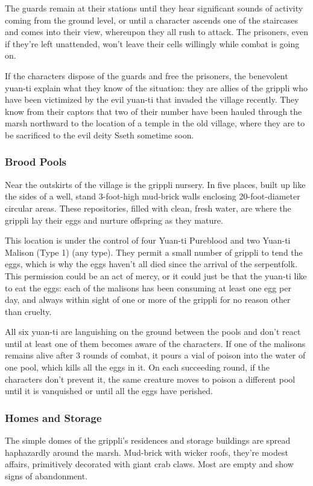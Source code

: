 \documentclass[10pt,a4paper,twoside,bg=print,twocolumn,openany,nodeprecatedcode]{dndbook}
\begin{document}
The guards remain at their stations until they hear significant sounds of activity coming from the ground level, or until a character ascends one of the staircases and comes into their view, whereupon they all rush to attack. The prisoners, even if they're left unattended, won't leave their cells willingly while combat is going on.

If the characters dispose of the guards and free the prisoners, the benevolent yuan-ti explain what they know of the situation: they are allies of the grippli who have been victimized by the evil yuan-ti that invaded the village recently. They know from their captors that two of their number have been hauled through the marsh northward to the location of a temple in the old village, where they are to be sacrificed to the evil deity Sseth sometime soon.

\subsubsection{Brood Pools}
Near the outskirts of the village is the grippli nursery. In five places, built up like the sides of a well, stand 3-foot-high mud-brick walls enclosing 20-foot-diameter circular areas. These repositories, filled with clean, fresh water, are where the grippli lay their eggs and nurture offspring as they mature.

This location is under the control of four Yuan-ti Pureblood and two Yuan-ti Malison (Type 1) (any type). They permit a small number of grippli to tend the eggs, which is why the eggs haven't all died since the arrival of the serpentfolk. This permission could be an act of mercy, or it could just be that the yuan-ti like to eat the eggs: each of the malisons has been consuming at least one egg per day, and always within sight of one or more of the grippli for no reason other than cruelty.

All six yuan-ti are languishing on the ground between the pools and don't react until at least one of them becomes aware of the characters. If one of the malisons remains alive after 3 rounds of combat, it pours a vial of poison into the water of one pool, which kills all the eggs in it. On each succeeding round, if the characters don't prevent it, the same creature moves to poison a different pool until it is vanquished or until all the eggs have perished.

\subsubsection{Homes and Storage}
\begin{DndReadAloud}{}
The simple domes of the grippli's residences and storage buildings are spread haphazardly around the marsh. Mud-brick with wicker roofs, they're modest affairs, primitively decorated with giant crab claws. Most are empty and show signs of abandonment.

\end{DndReadAloud}
\end{document}
